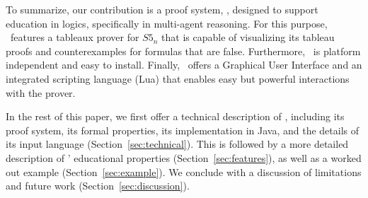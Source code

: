 To summarize, our contribution is a proof system, \oops, designed to support
education in logics, specifically in multi-agent reasoning. For this purpose,
\oops\ features a tableaux prover for $S5_n$ that is capable of visualizing its
tableau proofs and counterexamples for formulas that are false. Furthermore,
\oops\ is platform independent and easy to install. Finally, \oops\ offers a
Graphical User Interface and an integrated scripting language (Lua) that
enables easy but powerful interactions with the prover.
 
In the rest of this paper, we first offer a technical description of \oops,
including its proof system, its formal properties, its implementation in Java,
and the details of its input language (Section~\ref{sec:technical}).
This is followed by a more detailed description of \oops' educational
properties (Section~\ref{sec:features}), as well as a worked out example
(Section~\ref{sec:example}).
We conclude with a discussion of limitations and future work
(Section~\ref{sec:discussion}).
